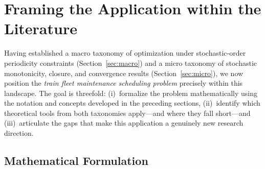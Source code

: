 \documentclass[11pt,a4paper]{article}
\theoremstyle{plain}
\theoremstyle{definition}
\theoremstyle{remark}
\begin{document}
\newpage

%

\section{Framing the Application within the Literature}
\label{sec:framing}

Having established a macro taxonomy of optimization under stochastic-order periodicity
constraints (Section~\ref{sec:macro}) and a micro taxonomy of stochastic monotonicity,
closure, and convergence results (Section~\ref{sec:micro}), we now position the
\emph{train fleet maintenance scheduling problem} precisely within this landscape.
The goal is threefold: (i)~formalize the problem mathematically using the notation
and concepts developed in the preceding sections, (ii)~identify which theoretical
tools from both taxonomies apply---and where they fall short---and (iii)~articulate
the gaps that make this application a genuinely new research direction.

\subsection{Mathematical Formulation}
\label{sec:framing:formulation}
\end{document}

